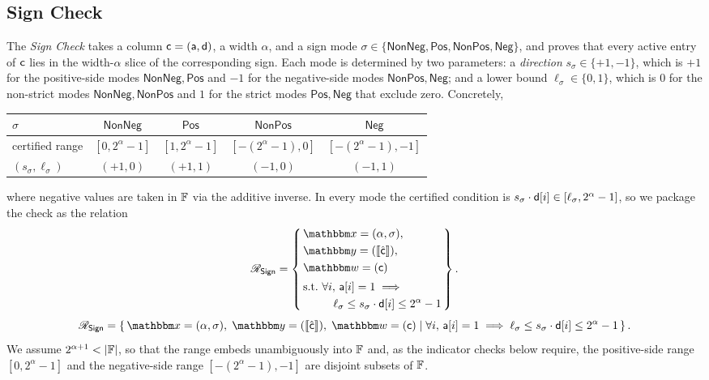 \subsection{Sign Check}
\label{sec:sign-check}
The \emph{Sign Check} takes a column $\mathsf{c} = (\mathsf{a}, \mathsf{d})$, a width $\alpha$, and a sign mode $\sigma \in \{\mathsf{NonNeg}, \mathsf{Pos}, \mathsf{NonPos}, \mathsf{Neg}\}$, and proves that every active entry of $\mathsf{c}$ lies in the width-$\alpha$ slice of the corresponding sign. Each mode is determined by two parameters: a \emph{direction} $s_\sigma \in \{+1, -1\}$, which is $+1$ for the positive-side modes $\mathsf{NonNeg}, \mathsf{Pos}$ and $-1$ for the negative-side modes $\mathsf{NonPos}, \mathsf{Neg}$; and a lower bound $\ell_\sigma \in \{0, 1\}$, which is $0$ for the non-strict modes $\mathsf{NonNeg}, \mathsf{NonPos}$ and $1$ for the strict modes $\mathsf{Pos}, \mathsf{Neg}$ that exclude zero. Concretely,
\begin{center}\small
\begin{tabular}{lcccc}
\toprule
$\sigma$ & $\mathsf{NonNeg}$ & $\mathsf{Pos}$ & $\mathsf{NonPos}$ & $\mathsf{Neg}$ \\
\midrule
certified range & $[0, 2^\alpha-1]$ & $[1, 2^\alpha-1]$ & $[-(2^\alpha-1), 0]$ & $[-(2^\alpha-1), -1]$ \\
$(s_\sigma, \ell_\sigma)$ & $(+1, 0)$ & $(+1, 1)$ & $(-1, 0)$ & $(-1, 1)$ \\
\bottomrule
\end{tabular}
\end{center}
where negative values are taken in $\mathbb{F}$ via the additive inverse. In every mode the certified condition is $s_\sigma\cdot\mathsf{d}[i] \in [\ell_\sigma, 2^\alpha-1]$, so we package the check as the relation
\ifsp
\begin{displaymath}
\NPRelation_{\mathsf{Sign}} = \left\{\,
  \begin{aligned}
    & \NPInstance = (\alpha, \sigma),\\
    & \NPInstancey = (\Oracle{\hat{\col}}),\\
    & \NPWitness = (\col)\\[2pt]
    & \text{s.t.}\ \forall i,\, \mathsf{a}[i] = 1 \implies{}\\
    & \phantom{\text{s.t.}}\ \quad \ell_\sigma \leq s_\sigma\mult\mathsf{d}[i] \leq 2^\alpha - 1
  \end{aligned}
\,\right\}.
\end{displaymath}
\else
\begin{displaymath}
\NPRelation_{\mathsf{Sign}} = \left\{\,
  \NPInstance = (\alpha, \sigma),\;
  \NPInstancey = (\Oracle{\hat{\col}}),\;
  \NPWitness = (\col)
  \;\middle|\;
    \forall i,\, \mathsf{a}[i] = 1 \implies \ell_\sigma \leq s_\sigma\mult\mathsf{d}[i] \leq 2^\alpha - 1
\,\right\}.
\end{displaymath}
\fi
We assume $2^{\alpha+1} < |\mathbb{F}|$, so that the range embeds unambiguously into $\mathbb{F}$ and, as the indicator checks below require, the positive-side range $[0, 2^\alpha-1]$ and the negative-side range $[-(2^\alpha-1), -1]$ are disjoint subsets of $\mathbb{F}$.


